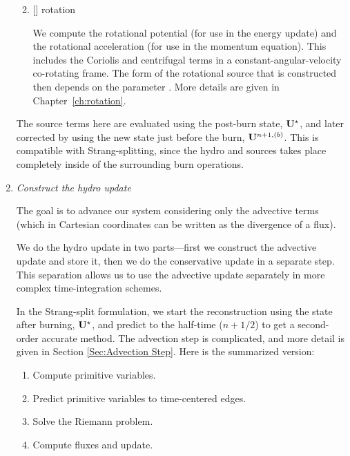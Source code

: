 \begin{enumerate}
\begin{enumerate}


  \item {[]} rotation

    We compute the rotational potential (for use in the energy update)
    and the rotational acceleration (for use in the momentum
    equation).  This includes the Coriolis and centrifugal terms in a
    constant-angular-velocity co-rotating frame.  The form of the
    rotational source that is constructed then depends on the
    parameter .  More details are
    given in Chapter~\ref{ch:rotation}.
    
  \end{enumerate}

  The source terms here are evaluated using the post-burn state,
  ${\bf U}^\star$, and later corrected by using the new state just before
  the burn, ${\bf U}^{n+1,(b)}$.  This is compatible with
  Strang-splitting, since the hydro and sources takes place completely
  inside of the surrounding burn operations.

\item {\em Construct the hydro update}

  The goal is to advance our system considering only the advective
  terms (which in Cartesian coordinates can be written as the
  divergence of a flux).

  We do the hydro update in two parts---first we construct the
  advective update and store it, then we do the conservative update in
  a separate step.  This separation allows us to use the advective
  update separately in more complex time-integration schemes.

  In the Strang-split formulation, we start the reconstruction using
  the state after burning, ${\bf U}^\star$, and predict to the half-time
  ($n+1/2$) to get a second-order accurate method.  The advection step
  is complicated, and more detail is given in Section
  \ref{Sec:Advection Step}.  Here is the summarized version:
  \begin{enumerate}
  \item Compute primitive variables.
  \item Predict primitive variables to time-centered edges.
  \item Solve the Riemann problem.
  \item Compute fluxes and update.
  \end{enumerate}


\end{enumerate}

